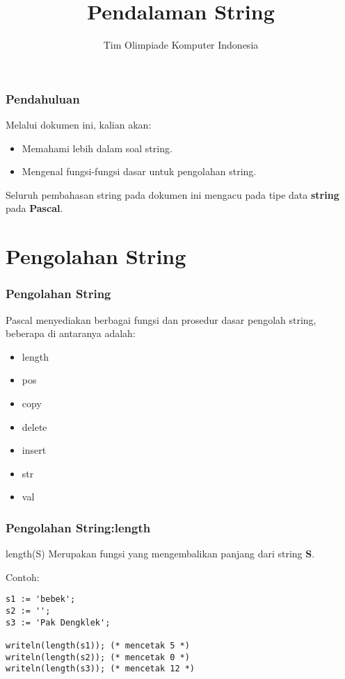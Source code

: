 \documentclass{beamer}
\title{Pendalaman String}
\author{Tim Olimpiade Komputer Indonesia}
\begin{document}
\begin{frame}
\titlepage
\end{frame}

\begin{frame}
\frametitle{Pendahuluan}
Melalui dokumen ini, kalian akan:
\begin{itemize}
	\item Memahami lebih dalam soal string.
	\item Mengenal fungsi-fungsi dasar untuk pengolahan string.
\end{itemize}
\vfill
Seluruh pembahasan string pada dokumen ini mengacu pada tipe data \textbf{string} pada \textbf{Pascal}.
\end{frame}

\section{Pengolahan String}
\frame{\sectionpage}

\begin{frame}
\frametitle{Pengolahan String}
Pascal menyediakan berbagai fungsi dan prosedur dasar pengolah string, beberapa di antaranya adalah:
\begin{itemize}
	\item length
	\item pos
	\item copy
	\item delete
	\item insert
	\item str
	\item val
\end{itemize}
\end{frame}

\begin{frame}[fragile]
\frametitle{Pengolahan String:\newline length}
\begin{block}{length(S)}
Merupakan fungsi yang mengembalikan panjang dari string \textbf{S}.
\end{block}

Contoh:
\begin{lstlisting}
s1 := 'bebek';
s2 := '';
s3 := 'Pak Dengklek';

writeln(length(s1)); (* mencetak 5 *)
writeln(length(s2)); (* mencetak 0 *)
writeln(length(s3)); (* mencetak 12 *)
\end{lstlisting}
\end{frame}
\end{document}
